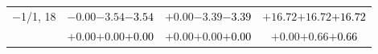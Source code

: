 \documentclass[compress]{beamer}
\begin{document}
\begin{frame}
\begin{tabular}{r | c | c | c}
$-$1/1, 18 & $-0.00$\hspace{0.1 cm}$-3.54$\hspace{0.1 cm}\textcolor{black}{$-3.54$} & $+0.00$\hspace{0.1 cm}$-3.39$\hspace{0.1 cm}\textcolor{black}{$-3.39$} & $+16.72$\hspace{0.1 cm}$+16.72$\hspace{0.1 cm}\textcolor{black}{$+16.72$} \\
           & $+0.00$\hspace{0.1 cm}$+0.00$\hspace{0.1 cm}\textcolor{black}{$+0.00$} & $+0.00$\hspace{0.1 cm}$+0.00$\hspace{0.1 cm}\textcolor{black}{$+0.00$} & $+0.00$\hspace{0.1 cm}$+0.66$\hspace{0.1 cm}\textcolor{black}{$+0.66$} \\
\end{tabular}
\end{frame}
\end{document}
